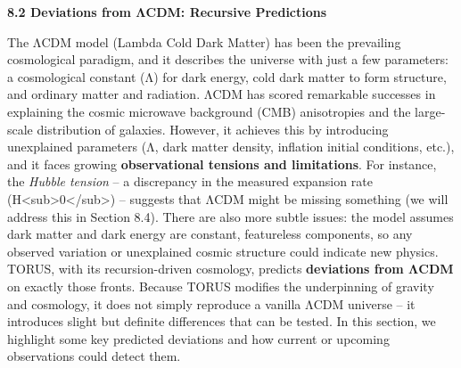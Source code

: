 \textbf{8.2 Deviations from ΛCDM: Recursive Predictions}

The ΛCDM model (Lambda Cold Dark Matter) has been the prevailing
cosmological paradigm, and it describes the universe with just a few
parameters: a cosmological constant (Λ) for dark energy, cold dark
matter to form structure, and ordinary matter and radiation. ΛCDM has
scored remarkable successes in explaining the cosmic microwave
background (CMB) anisotropies and the large-scale distribution of
galaxies. However, it achieves this by introducing unexplained
parameters (Λ, dark matter density, inflation initial conditions, etc.),
and it faces growing \textbf{observational tensions and limitations}.
For instance, the \emph{Hubble tension} -- a discrepancy in the measured
expansion rate
(H\textless{}sub\textgreater{}0\textless{}/sub\textgreater{}) --
suggests that ΛCDM might be missing something (we will address this in
Section 8.4). There are also more subtle issues: the model assumes dark
matter and dark energy are constant, featureless components, so any
observed variation or unexplained cosmic structure could indicate new
physics. TORUS, with its recursion-driven cosmology, predicts
\textbf{deviations from ΛCDM} on exactly those fronts. Because TORUS
modifies the underpinning of gravity and cosmology, it does not simply
reproduce a vanilla ΛCDM universe -- it introduces slight but definite
differences that can be tested. In this section, we highlight some key
predicted deviations and how current or upcoming observations could
detect them.

